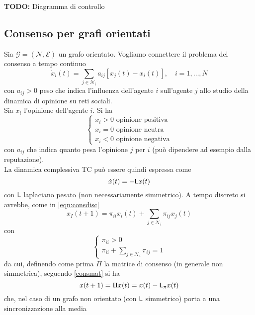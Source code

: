\textbf{TODO:} Diagramma di controllo

\subsection{Consenso per grafi orientati}

Sia $\mathcal{G} = (\mathcal{N}, \mathcal{E})$ un grafo orientato. Vogliamo connettere il problema del consenso a tempo continuo 
\begin{equation}
    \dot{x}_i(t) = \sum_{j \in \mathcal{N}_i} a_{ij}[x_j(t)- x_i(t)], \quad i = 1, \dots, N
\end{equation} con $a_{ij}>0$ peso che indica l'influenza dell'agente $i$ sull'agente $j$ allo studio della dinamica di opinione su reti sociali.\\
Sia $x_i$ l'opinione dell'agente $i$. Si ha
  \begin{equation}
  \begin{cases}
  x_i>0 \text{ opinione positiva}\\
  x_i=0 \text{ opinione neutra}\\
  x_i<0 \text{ opinione negativa}
  \end{cases}
  \end{equation}
con $a_{ij}$ che indica quanto pesa l'opinione $j$ per $i$ (può dipendere ad esempio dalla reputazione).\\
La dinamica complessiva TC pu\`o essere quindi espressa come
\begin{equation}
    \dot{x}(t) = -\mathsf{L} x(t)
\end{equation}con $\mathsf{L}$ laplaciano pesato (non necessariamente simmetrico). A tempo discreto si avrebbe, come in \ref{eqn:consdisc}
\begin{equation}
    x_I(t+1) = \pi_{ii} x_i(t)+\sum_{j \in \mathcal{N}_i} \pi_{ij} x_j(t)
\end{equation}
con
\begin{equation}
\begin{cases}
\pi_{ii} > 0\\
\pi_{ii} + \sum_{j \in \mathcal{N}_i} \pi_{ij} = 1
\end{cases}
\end{equation}
da cui, definendo come prima $\Pi$ la matrice di consenso (in generale non simmetrica), seguendo \ref{consmat} si ha
\begin{equation}
    x(t+1) = \Pi x(t) = x(t) - \mathsf{L}_{\pi} x(t)
\end{equation}
che, nel caso di un grafo non orientato (con $\mathsf{L}$ simmetrico) porta a una sincronizzazione alla media
